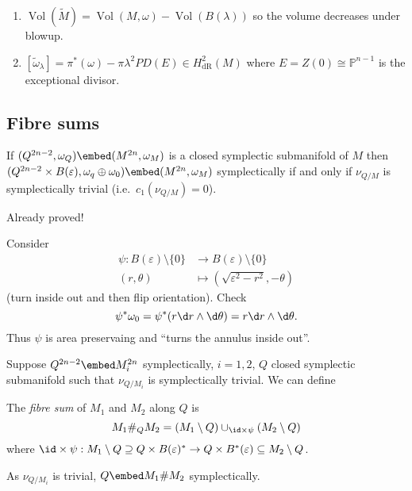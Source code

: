 \documentclass[a4paper]{article}
\renewcommand*{\P}{\mathbb{P}}
\newcommand{\w}{\wedge} %
\DeclareMathOperator{\Vol}{Vol} %
\begin{document}
\begin{note}\leavevmode
  \begin{enumerate}
  \item \(\Vol(\tilde M) = \Vol(M, \omega) - \Vol(B(\lambda))\) so the volume decreases under blowup.
  \item \([\tilde \omega_\lambda] = \pi^*(\omega) - \pi \lambda^2 PD(E) \in H^2_{\mathrm{dR}}(M)\) where \(E = Z(0) \cong \P^{n - 1}\) is the exceptional divisor.
  \end{enumerate}
\end{note}

\subsection{Fibre sums}

\begin{lemma}
  If \((Q^{2n - 2}, \omega_Q) \embed (M^{2n}, \omega_M)\) is a closed symplectic submanifold of \(M\) then \((Q^{2n - 2} \times B(\varepsilon), \omega_q \oplus \omega_0) \embed (M^{2n}, \omega_M)\) symplectically if and only if \(\nu_{Q/M}\) is symplectically trivial (i.e.\ \(c_1(\nu_{Q/M}) = 0\)).
\end{lemma}

Already proved!

Consider
\begin{align*}
  \psi: B(\varepsilon) \setminus \{0\} &\to B(\varepsilon) \setminus \{0\} \\
  (r, \theta) &\mapsto (\sqrt{\varepsilon^2 - r^2}, - \theta)
\end{align*}
(turn inside out and then flip orientation). Check
\[
  \psi^*\omega_0 = \psi^*(r \d r \w \d \theta) = r \d r \w \d \theta.
\]
Thus \(\psi\) is area preservaing and ``turns the annulus inside out''.

Suppose \(Q^{2n - 2} \embed M_i^{2n}\) symplectically, \(i = 1, 2\), \(Q\) closed symplectic submanifold such that \(\nu_{Q/M_i}\) is symplectically trivial. We can define

\begin{definition}
  The \emph{fibre sum} of \(M_1\) and \(M_2\) along \(Q\) is
  \[
    M_1 \#_Q M_2 = (M_1 \setminus Q) \cup_{\id \times \psi} (M_2 \setminus Q)
  \]
  where \(\id \times \psi: M_1 \setminus Q \supseteq Q \times B(\varepsilon)^* \to Q \times B^*(\varepsilon) \subseteq M_2 \setminus Q\).
\end{definition}

\begin{note}
  As \(\nu_{Q/M_i}\) is trivial, \(Q \embed M_1 \# M_2\) symplectically.
\end{note}
\end{document}
